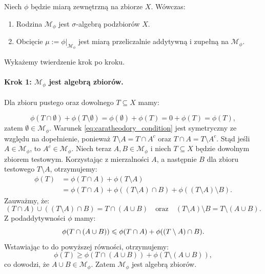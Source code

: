 \begin{tw}\label{tw:caratheodory}
    Niech $\phi$ będzie miarą zewnętrzną na zbiorze $X$. Wówczas:
    \begin{enumerate}
        \item[(i)] Rodzina $\mathcal{M}_\phi$ jest $\sigma$-algebrą podzbiorów $X$.
        \item[(ii)] Obcięcie $\mu := \phi|_{\mathcal{M}_\phi}$ jest miarą przeliczalnie addytywną i zupełną na $\mathcal{M}_\phi$.
    \end{enumerate}
\end{tw}
\begin{dow} Wykażemy twierdzenie krok po kroku.
    \paragraph{Krok 1: $\mathcal{M}_\phi$ jest algebrą zbiorów.} Dla zbioru pustego oraz dowolnego $T \subseteq X$ mamy:

    \begin{equation*} \phi(T \cap \emptyset) + \phi(T \setminus \emptyset) = \phi(\emptyset) + \phi(T) = 0 + \phi(T) = \phi(T),
    \end{equation*}
    zatem $\emptyset \in \mathcal{M}_\phi$. Warunek \eqref{eq:caratheodory_condition} jest symetryczny ze względu na dopełnienie, ponieważ $T \setminus A = T \cap A^c$ oraz $T \cap A = T \setminus A^c$.
    Stąd jeśli $A \in \mathcal{M}_\phi$, to $A^c \in \mathcal{M}_\phi$.
    Niech teraz $A, B \in \mathcal{M}_\phi$ i niech $T \subseteq X$ będzie dowolnym zbiorem testowym. Korzystając z mierzalności $A$, a następnie $B$ dla zbioru testowego $T \setminus A$, otrzymujemy:
    \begin{align}
        \phi(T) & = \phi(T \cap A) + \phi(T \setminus A)                                               \\
                & = \phi(T \cap A) + \phi((T \setminus A) \cap B) + \phi((T \setminus A) \setminus B).
    \end{align} Zauważmy, że:
    \begin{equation*}
        (T \cap A) \cup ((T \setminus A) \cap B) = T \cap (A \cup B) \quad \text{oraz} \quad (T \setminus A) \setminus B = T \setminus (A \cup B).
    \end{equation*}
    Z podaddytywności $\phi$ mamy:
    \begin{equation*}
        \phi(T \cap (A \cup B)) \leqslant \phi(T \cap A) + \phi((T \setminus A) \cap B). \end{equation*}
    Wstawiając to do powyższej równości, otrzymujemy:
    \begin{equation*}
        \phi(T) \ge \phi(T \cap (A \cup B)) + \phi(T \setminus (A \cup B)),
    \end{equation*}
    co dowodzi, że $A \cup B \in \mathcal{M}_\phi$. Zatem $\mathcal{M}_\phi$ jest algebrą zbiorów.


\end{dow}
